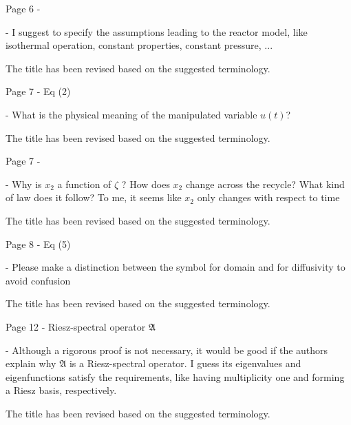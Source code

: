 \documentclass[10pt,answers]{exam}
\begin{document}
\begin{questions}
    \question Page 6 - 

    - I suggest to specify the assumptions leading to the reactor model, like isothermal operation,
    constant properties, constant pressure, ...

    \begin{solutionorbox}
        The title has been revised based on the suggested terminology.
    \end{solutionorbox}


    \question Page 7 - Eq (2)

    - What is the physical meaning of the manipulated variable $u(t)$?

    \begin{solutionorbox}
        The title has been revised based on the suggested terminology.
    \end{solutionorbox}


    \question Page 7 - 

    - Why is $x_2$ a function of $\zeta$ ? How does $x_2$ change across the recycle? What kind of law does it follow? To me, it seems like $x_2$ only changes with respect to time

    \begin{solutionorbox}
        The title has been revised based on the suggested terminology.
    \end{solutionorbox}


    \question Page 8 - Eq (5)
    
    - Please make a distinction between the symbol for domain and for diffusivity to avoid confusion

    \begin{solutionorbox}
        The title has been revised based on the suggested terminology.
    \end{solutionorbox}


    \question Page 12 - Riesz-spectral operator $\mathfrak{A}$

    - Although a rigorous proof is not necessary, it would be good if the authors explain why $\mathfrak{A}$ is a Riesz-spectral operator. I guess its eigenvalues and eigenfunctions satisfy the requirements, like having multiplicity one and forming a Riesz basis, respectively.

    \begin{solutionorbox}
        The title has been revised based on the suggested terminology.
    \end{solutionorbox}



\end{questions}
\end{document}

